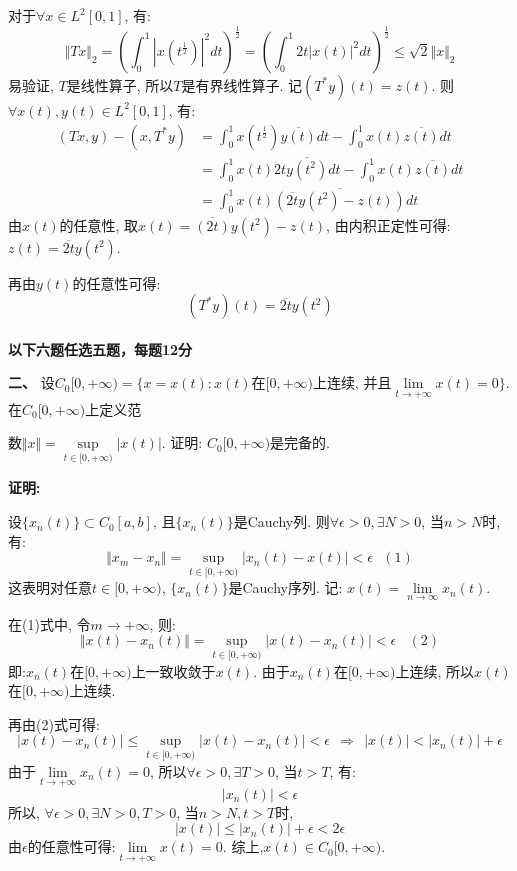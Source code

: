 \documentclass{article}
\begin{document}
对于$\forall x \in L^2[0,1]$, 有:
$$ \Vert Tx \Vert _2 = \left(\int_0^1 |x(t^{\frac{1}{2}}) |^2 dt \right)^{\frac{1}{2}} = \left( \int_0^1 2t\left| x(t) \right|^2 dt\right)^{\frac{1}{2}} \leq \sqrt{2} \Vert x \Vert_2  $$
易验证, $T$是线性算子, 所以$T$是有界线性算子. 记$(T^*y)(t) = z(t)$. 则$\forall x(t), y(t) \in L^2[0,1]$, 有:
\begin{align*}
(Tx, y) - (x, T^*y) &= \int_0^1x(t^{\frac{1}{2}})\overline{y(t)}dt - \int_0^1x(t)\overline{z(t)}dt \\
  & =\int_0^1 x(t) 2t \overline{y(t^2)}dt - \int_0^1 x(t)\overline{z(t)}dt \\
  & = \int_0^1 x(t) \overline{\left( \overline{2t} y(t^2) - z(t) \right)}dt
\end{align*}
由$x(t)$的任意性, 取$x(t) = \overline{(2t)}y(t^2) - z(t)$, 由内积正定性可得: $ z(t) = \overline{2t}y(t^2)$.

 再由$y(t)$的任意性可得:
$$ (T^*y)(t) = \overline{2t} y(t^2) $$ \\


\textbf{以下六题任选五题，每题12分}

\textbf{二、} 设$C_0[0, +\infty) = \{ x=x(t):x(t)\text{在}[0, +\infty)\text{上连续, 并且} \lim\limits_{t \rightarrow +\infty} x(t) = 0 \}$. 在$C_0[0, +\infty)$上定义范

\hspace{2em} 数$\Vert x \Vert = \sup\limits_{t \in [0, +\infty)} |x(t)|$. 证明: $C_0[0, +\infty)$是完备的. 

\textbf{证明:}

设$\{ x_n(t) \} \subset C_0[a,b]$, 且$\{ x_n(t) \}$是Cauchy列. 则$\forall \epsilon>0, \exists N>0$, 当$n>N$时, 有:
$$  \Vert x_m - x_n \Vert = \sup\limits_{t \in [0, +\infty)} |x_n(t) - x(t)| < \epsilon \ \ \ (1)$$
这表明对任意$t \in [0, +\infty)$, $\{ x_n(t) \}$是Cauchy序列. 记: $x(t) = \lim\limits_{n \rightarrow \infty} x_n(t)$.

在(1)式中, 令$m \rightarrow +\infty $, 则:
$$ \Vert x(t) - x_n(t) \Vert = \sup\limits_{t \in [0, +\infty)} |x(t) - x_n(t)| < \epsilon \ \ \ \ (2)$$
即:$x_n(t)$在$[0, +\infty)$上一致收敛于$x(t)$. 由于$x_n(t)$在$[0, +\infty)$上连续, 所以$x(t)$在$[0,+\infty)$上连续. 

再由(2)式可得:
$$ |x(t) - x_n(t)| \leq \sup\limits_{t \in [0, +\infty)} |x(t) - x_n(t)| < \epsilon \ \ \Rightarrow \ \ |x(t)| < |x_n(t)| + \epsilon  $$
由于$\lim\limits_{t \rightarrow +\infty} x_n(t) = 0$, 所以$\forall \epsilon >0, \exists T>0$, 当$t>T$, 有:
$$ |x_n(t)| < \epsilon $$
所以, $\forall \epsilon>0, \exists N>0, T>0$, 当$n>N, t>T$时, 
$$ |x(t)| \leq |x_n(t)| + \epsilon < 2\epsilon  $$
由$\epsilon$的任意性可得:$ \lim\limits_{t \rightarrow +\infty} x(t) = 0 $. 综上,$x(t) \in C_0[0, +\infty)$.
\end{document}
